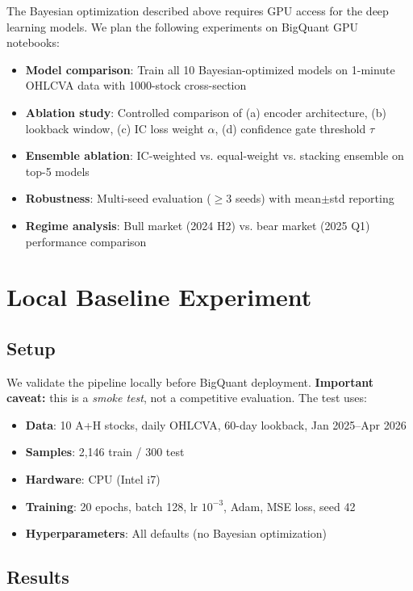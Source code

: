 \documentclass[sigconf,10pt]{acmart}
\begin{document}
The Bayesian optimization described above requires GPU access for the deep learning models. We plan the following experiments on BigQuant GPU notebooks:

\begin{itemize}
  \item \textbf{Model comparison}: Train all 10 Bayesian-optimized models on 1-minute OHLCVA data with 1000-stock cross-section
  \item \textbf{Ablation study}: Controlled comparison of (a) encoder architecture, (b) lookback window, (c) IC loss weight $\alpha$, (d) confidence gate threshold $\tau$
  \item \textbf{Ensemble ablation}: IC-weighted vs. equal-weight vs. stacking ensemble on top-5 models
  \item \textbf{Robustness}: Multi-seed evaluation ($\ge 3$ seeds) with mean$\pm$std reporting
  \item \textbf{Regime analysis}: Bull market (2024 H2) vs. bear market (2025 Q1) performance comparison
\end{itemize}

\section{Local Baseline Experiment}

\subsection{Setup}
We validate the pipeline locally before BigQuant deployment. \textbf{Important caveat:} this is a \emph{smoke test}, not a competitive evaluation. The test uses:
\begin{itemize}
  \item \textbf{Data}: 10 A+H stocks, daily OHLCVA, 60-day lookback, Jan 2025--Apr 2026
  \item \textbf{Samples}: 2,146 train / 300 test
  \item \textbf{Hardware}: CPU (Intel i7)
  \item \textbf{Training}: 20 epochs, batch 128, lr $10^{-3}$, Adam, MSE loss, seed 42
  \item \textbf{Hyperparameters}: All defaults (no Bayesian optimization)
\end{itemize}

\subsection{Results}
\end{document}
